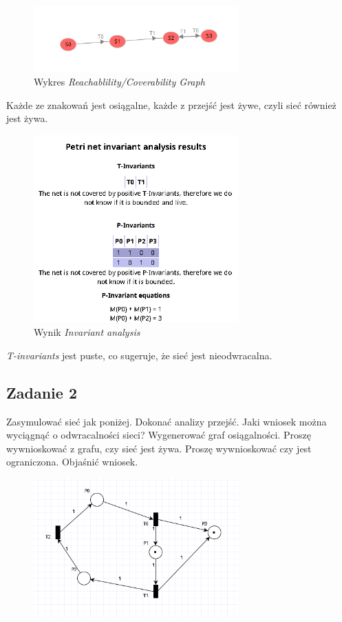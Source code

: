 \documentclass{article}
\begin{document}
\begin{figure}[H]
    \centering
    \includegraphics[width=0.7\textwidth]{reachability_1.png}
    \caption{Wykres \textit{Reachablility/Coverability Graph}}
\end{figure}

Każde ze znakowań jest osiągalne, każde z przejść jest żywe, czyli sieć również jest żywa.

\begin{figure}[H]
    \centering
    \includegraphics[width=0.7\textwidth]{invariant_1.png}
    \caption{Wynik \textit{Invariant analysis}}
\end{figure}

\textit{T-invariants} jest puste, co sugeruje, że sieć jest nieodwracalna.

\subsection{Zadanie 2}
Zasymulować sieć jak poniżej. Dokonać analizy przejść. Jaki wniosek można wyciągnąć o odwracalności
sieci? Wygenerować graf osiągalności. Proszę wywnioskować z grafu, czy sieć jest żywa.
Proszę wywnioskować czy jest ograniczona. Objaśnić wniosek.

\begin{figure}[H]
    \centering
    \includegraphics[width=0.7\textwidth]{net_2.png}
\end{figure}
\end{document}
